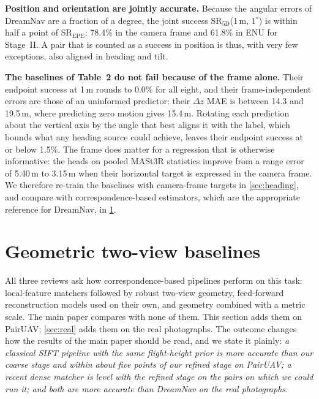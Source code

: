 \documentclass[10pt,twocolumn,letterpaper]{article}
\newcommand{\SRe}{SR$_{\mathrm{EPE}}$}
\newcommand{\SRf}{SR$_{\mathrm{5D}}$}
\begin{document}
\noindent\textbf{Position and orientation are jointly accurate.} Because the angular errors of DreamNav are a fraction of a degree, the joint success \SRf(1\,m, $1^\circ$) is within half a point of \SRe: 78.4\% in the camera frame and 61.8\% in ENU for Stage~II. A pair that is counted as a success in position is thus, with very few exceptions, also aligned in heading and tilt.

\noindent\textbf{The baselines of Table~2 do not fail because of the frame alone.} Their endpoint success at 1\,m rounds to 0.0\% for all eight, and their frame-independent errors are those of an uninformed predictor: their $\Delta z$ MAE is between 14.3 and 19.5\,m, where predicting zero motion gives 15.4\,m. Rotating each prediction about the vertical axis by the angle that best aligns it with the label, which bounds what any heading source could achieve, leaves their endpoint success at or below 1.5\%. The frame does matter for a regression that is otherwise informative: the heads on pooled MASt3R statistics improve from a range error of 5.40\,m to 3.15\,m when their horizontal target is expressed in the camera frame. We therefore re-train the baselines with camera-frame targets in \cref{sec:heading}, and compare with correspondence-based estimators, which are the appropriate reference for DreamNav, in \cref{sec:geometric}.

\section{Geometric two-view baselines}
\label{sec:geometric}

All three reviews ask how correspondence-based pipelines perform on this task: local-feature matchers followed by robust two-view geometry, feed-forward reconstruction models used on their own, and geometry combined with a metric scale. The main paper compares with none of them. This section adds them on PairUAV; \cref{sec:real} adds them on the real photographs. The outcome changes how the results of the main paper should be read, and we state it plainly: \emph{a classical SIFT pipeline with the same flight-height prior is more accurate than our coarse stage and within about five points of our refined stage on PairUAV; a recent dense matcher is level with the refined stage on the pairs on which we could run it; and both are more accurate than DreamNav on the real photographs.}
\end{document}
